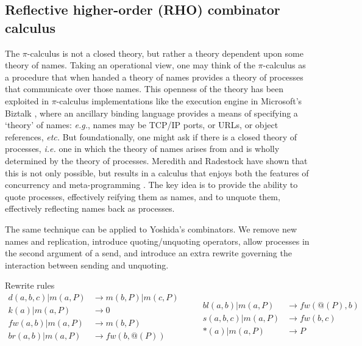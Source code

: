 \documentclass{llncs}
\makeatletter
\newcommand{\pic}{$\pi$-calculus}
\newcommand{\scong}{\mathbin{\equiv}}
\newcommand{\quotep}[1]{\mathsf{@}#1}
\newcommand{\bc}{\mathbin{\mathbf{::=}}}
\newcommand{\bm}{\mathbin{\mathbf\mid}}
\newcommand{\red}{\rightarrow}
\makeatother
\begin{document}
\subsection{Reflective higher-order (RHO) combinator calculus}
The {\pic} is not a closed theory, but rather a theory dependent upon
some theory of names. Taking an operational view, one may think of the
{\pic} as a procedure that when handed a theory of names provides a
theory of processes that communicate over those names. This openness
of the theory has been exploited in {\pic} implementations like the
execution engine in Microsoft's Biztalk \cite{biztalk}, where an
ancillary binding language provides a means of specifying a `theory'
of names: {\em e.g.}, names may be TCP/IP ports, or URLs, or object
references, {\em etc.}  But foundationally, one might ask if there is
a closed theory of processes, {\em i.e.} one in which the theory of
names arises from and is wholly determined by the theory of
processes. Meredith and Radestock have shown that this is not only
possible, but results in a calculus that enjoys both the features of
concurrency and meta-programming
\cite{DBLP:journals/entcs/MeredithR05}. The key idea is to provide the
ability to quote processes, effectively reifying them as names, and to
unquote them, effectively reflecting names back as processes.

The same technique can be applied to Yoshida's combinators. We remove
new names and replication, introduce quoting/unquoting operators,
allow processes in the second argument of a send, and introduce an
extra rewrite governing the interaction between sending and unquoting.


Rewrite rules
\[\begin{array}{rl}
  d(a,b,c) | m(a,P) & \red m(b,P) | m(c,P) \\
  k(a) | m(a,P) & \red 0 \\
  fw(a,b) | m(a,P) & \red m(b,P) \\
  br(a,b) | m(a,P) & \red fw(b,@(P)) \\  
\end{array} \quad \quad
\begin{array}{rl}
  bl(a,b) | m(a,P) & \red fw(@(P),b) \\
  s(a,b,c) | m(a,P) & \red fw(b,c) \\
  *(a) | m(a,P) & \red P
\end{array}\]
\end{document}
